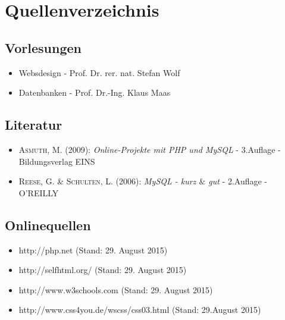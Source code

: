 \section{Quellenverzeichnis}

\subsection*{Vorlesungen}
\begin{itemize}
	\item Websdesign - Prof. Dr. rer. nat. Stefan Wolf
	\item Datenbanken - Prof. Dr.-Ing. Klaus Maas  
\end{itemize}

\subsection*{Literatur}
\begin{itemize}
	\item \textsc{Asmuth, M.} (2009): \textit{Online-Projekte mit PHP und MySQL} -  3.Auflage - \\ Bildungsverlag EINS
	\item \textsc{Reese, G. \&  Schulten, L.} (2006): \textit{MySQL - kurz $\&$ gut} -  2.Auflage - O'REILLY
\end{itemize}

\subsection*{Onlinequellen}
\begin{itemize}
	\item http://php.net (Stand: 29. August 2015)
	\item http://selfhtml.org/ (Stand: 29. August 2015)
	\item http://www.w3schools.com (Stand: 29. August 2015)
	\item http://www.css4you.de/wscss/css03.html (Stand: 29.August 2015)
\end{itemize}